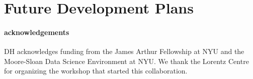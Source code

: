 \documentclass[12pt]{emulateapj}
\begin{document}
\section{Future Development Plans}
\label{sec:future}

\paragraph{acknowledgements}
DH acknowledges funding from the James Arthur Fellowship at NYU and the Moore-Sloan Data Science Environment at NYU. 
We thank the Lorentz Centre for organizing the workshop that started this collaboration.
\clearpage



\end{document}
